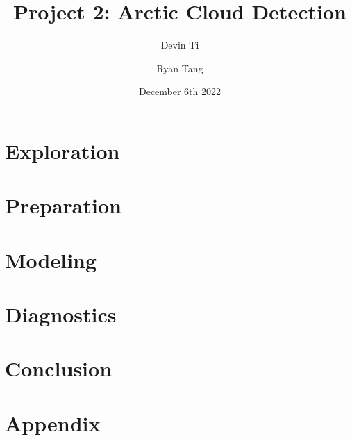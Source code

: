 \documentclass[11pt, letterpaper, journal]{IEEEtran}
\title{Project 2: Arctic Cloud Detection}
\author[1]{Devin Ti}
\author[1]{Ryan Tang}
\affil[1]{Duke University, Statistical Science}
\date{December 6th 2022}
\begin{document}
\maketitle

\begin{abstract}
\lipsum[2-4]
\end{abstract}

\section{Exploration}
\lipsum[2-4]

\section{Preparation}
\lipsum[2-4]

\section{Modeling}
\lipsum[2-4]

\section{Diagnostics}
\lipsum[2-4]

\section{Conclusion}
\lipsum[2-4]

\section{Appendix}
\lipsum[2-4]
\end{document}
